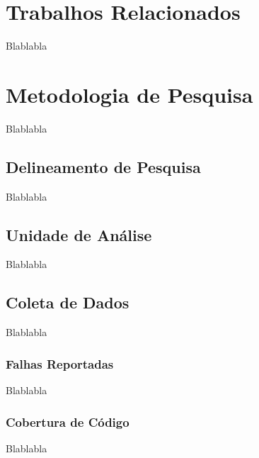 \documentclass[11.5pt]{article}
\begin{document}
\section{Trabalhos Relacionados}
Blablabla




\section{Metodologia de Pesquisa}
Blablabla


\subsection{Delineamento de Pesquisa}
Blablabla


\subsection{Unidade de Análise} \label{Unidade de Análise}
Blablabla


\subsection{Coleta de Dados}
Blablabla

\subsubsection{Falhas Reportadas}
Blablabla

\subsubsection{Cobertura de Código}
Blablabla

\end{document}
